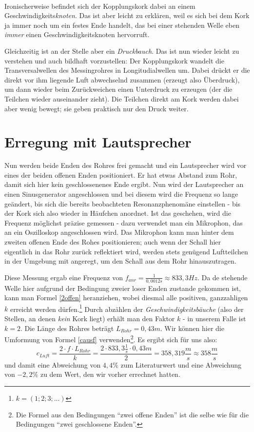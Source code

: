 ~\\


Ironischerweise befindet sich der Kopplungskork dabei an einem Geschwindigkeits\emph{knoten}. Das ist aber leicht zu erklären, weil es sich bei dem Kork ja immer noch um ein festes Ende handelt, das bei einer stehenden Welle eben \emph{immer} einen Geschwindigkeitsknoten hervorruft. 

Gleichzeitig ist an der Stelle aber ein \emph{Druckbauch}. Das ist nun wieder leicht zu verstehen und auch bildhaft vorzustellen: Der Kopplungskork wandelt die Transversalwellen des Messingrohres in Longitudialwellen um. Dabei drückt er die direkt vor ihm liegende Luft abwechselnd zusammen (erzeugt also Überdruck), um dann wieder beim Zurückweichen einen Unterdruck zu erzeugen (der die Teilchen wieder auseinander zieht). Die Teilchen direkt am Kork werden dabei aber wenig bewegt; sie geben praktisch nur den Druck weiter.




		\section{Erregung mit Lautsprecher}


Nun werden beide Enden des Rohres frei gemacht und ein Lautsprecher wird vor eines der beiden offenen Enden positioniert. Er hat etwas Abstand zum Rohr, damit sich hier kein geschlossenenes Ende ergibt. Nun wird der Lautsprecher an einen Sinusgenerator angeschlossen und bei diesem wird die Frequenz so lange geändert, bis sich die bereits beobachteten Resonanzphenomäne einstellen - bis der Kork sich also wieder in Häufchen anordnet. Ist das geschehen, wird die Frequenz möglichst präzise gemessen - dazu verwendet man ein Mikrophon, das an ein Oszilloskop angeschlossen wird. Das Mikrophon kann man hinter dem zweiten offenen Ende des Rohes positionieren; auch wenn der Schall hier eigentlich in das Rohr zurück reflektiert wird, werden stets genügend Luftteilchen in der Umgebung mit angeregt, um den Schall aus dem Rohr hinauszutragen.

Diese Messung ergab eine Frequenz von \(f_{anr} = \frac{1}{0,0012s} \approx 833,3Hz\). Da de stehende Welle hier aufgrund der Bedingung zweier loser Enden zustande gekommen ist, kann man Formel \ref{2offen} heranziehen, wobei diesmal alle positiven, ganzzahligen \(k\) erreicht werden dürfen.\footnote{\(k = (1; 2; 3; ...)\)} Durch abzählen der \textit{Geschwindigkeitsbäuche} (also der Stellen, an denen \emph{kein} Kork liegt) erhält man den Faktor \(k\) - in unserem Falle ist \(k = 2\). Die Länge des Rohres beträgt \(L_{Rohr} = 0,43m\). Wir können hier die Umformung von Formel \ref{causf} verwenden\footnote{Die Formel aus den Bedingungen ``zwei offene Enden'' ist die selbe wie für die Bedingungen ``zwei geschlossene Enden''.}. Es ergibt sich für uns also:
\begin{equation}
 	c_{Luft} = \frac{2 \cdot f \cdot L_{Rohr}}{k} = \frac{2 \cdot 833,3\frac{1}{s} \cdot 0,43m}{2} = 358,319\frac{m}{s}  \approx 358 \frac{m}{s}
\end{equation}
und damit eine Abweichung von \(4,4\%\) zum Literaturwert und eine Abweichung von \(-2,2\%\) zu dem Wert, den wir vorher errechnet hatten.


